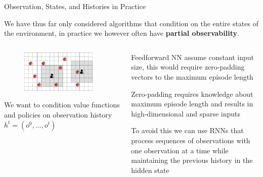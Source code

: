 \begin{frame}{Observation, States, and Histories in Practice}

We have thus far only considered algorithms that condition on the entire states of the environment, in practice we however often have \textbf{partial observability}.

\begin{columns}
    \begin{column}{0.4\textwidth}
        \begin{figure}
            \centering
            \includegraphics[width=0.9\textwidth]{images/environments/lbf/foraging_po.png}
        \end{figure}
        We want to condition value functions and policies on observation history $h^t = (o^0, ..., o^t)$
    \end{column}
    \begin{column}{0.6\textwidth}
        \blist
            \item<2-> Feedforward NN assume constant input size, this would require zero-padding vectors to the maximum episode length
            \item<2-> Zero-padding requires knowledge about maximum episode length and results in high-dimensional and sparse inputs
            \item<3-> To avoid this we can use RNNs that process sequences of observations with one observation at a time while maintaining the previous history in the hidden state
        \elist
    \end{column}
\end{columns}

\end{frame}

